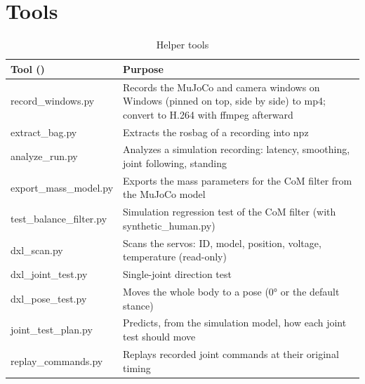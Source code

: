 \documentclass[11pt,a4paper]{article}
\newcommand{\code}[1]{\texttt{\detokenize{#1}}}
\begin{document}
\section{Tools}
\label{sec:tools}
\begin{table}[H]
\centering\small
\begin{tabularx}{\textwidth}{>{\ttfamily}p{4.6cm}Y}
\toprule
\normalfont Tool (\code{tools/}) & Purpose \\
\midrule
record\_windows.py & Records the MuJoCo and camera windows on Windows (pinned on top, side by side) to mp4; convert to H.264 with ffmpeg afterward \\
extract\_bag.py & Extracts the rosbag of a recording into npz \\
analyze\_run.py & Analyzes a simulation recording: latency, smoothing, joint following, standing \\
export\_mass\_model.py & Exports the mass parameters for the CoM filter from the MuJoCo model \\
test\_balance\_filter.py & Simulation regression test of the CoM filter (with synthetic\_human.py) \\
dxl\_scan.py & Scans the servos: ID, model, position, voltage, temperature (read-only) \\
dxl\_joint\_test.py & Single-joint direction test \\
dxl\_pose\_test.py & Moves the whole body to a pose (0° or the default stance) \\
joint\_test\_plan.py & Predicts, from the simulation model, how each joint test should move \\
replay\_commands.py & Replays recorded joint commands at their original timing \\
\bottomrule
\end{tabularx}
\caption{Helper tools}
\end{table}

\newpage
\end{document}
